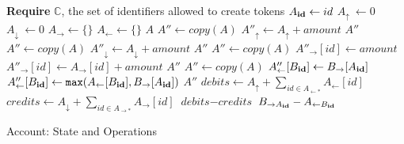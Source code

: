 \documentclass[9pt, oneside]{article}   	%
\begin{document}
\begin{algorithm}
\begin{algorithmic}[1]
   \State \textbf{Require} $\mathds{C}$, the set of identifiers allowed to create tokens
   \State
    	\State $A_{\scriptsize\textbf{id}} \leftarrow id$
	\State $A_\uparrow ~\leftarrow 0$       
	\State $A_\downarrow ~\leftarrow 0$   
	\State $A_\rightarrow \leftarrow \{ \}$ 
	\State $A_\leftarrow \leftarrow \{ \}$ 
    	\State \Return $A$
    \EndFunction
    \State
        \State $A'' \leftarrow \textit{copy}(A)$ 
		 \State $A''_\uparrow \leftarrow A_\uparrow + \textit{amount}$ 
	\EndIf
	\State \Return $A''$
    \EndFunction
    \State
        \State $A'' \leftarrow \textit{copy}(A)$
    	 \label{ln:burn-balance-check}
		 \State $A''_\downarrow \leftarrow A_\downarrow + \textit{amount}$ 
	\EndIf
	\State \Return $A''$
    \EndFunction
    \State
        \State $A'' \leftarrow \textit{copy}(A)$
    	  \label{ln:give-balance-check}
			\State $A''_{\rightarrow}[id] \leftarrow \textit{amount}$ 
		\Else
		         \State $A''_{\rightarrow}[id] \leftarrow A_{\rightarrow}[id] + \textit{amount}$ 
		\EndIf
	\EndIf
	\State \Return $A''$
    \EndFunction
    \State
        \State $A'' \leftarrow \textit{copy}(A)$
			 \State $A''_{\leftarrow}[B_{\scriptsize\textbf{id}}] \leftarrow B_{\rightarrow}[A_{\scriptsize\textbf{id}}]$
		\Else
			 \State $A''_{\leftarrow}[B_{\scriptsize\textbf{id}}] \leftarrow \texttt{max}(A_{\leftarrow}[B_{\scriptsize\textbf{id}}], B_{\rightarrow}[A_{\scriptsize\textbf{id}}])$ 
		\EndIf
        \EndIf
	\State \Return $A''$
    \EndFunction
    \State
        \State $\textit{debits} \leftarrow A_\uparrow + \sum\limits_{id \in A_{\leftarrow *}} A_{\leftarrow}[id]$ 
        \State $\textit{credits} \leftarrow A_\downarrow + \sum\limits_{id \in A_{\rightarrow *}} A_{\rightarrow}[id]$
        \State \Return $\textit{debits} - \textit{credits}$
    \EndFunction
    \State
        \State \Return $B_{\rightarrow A_{\tiny\textbf{id}}} - A_{\leftarrow B_{\tiny\textbf{id}}}$
    \EndFunction
    \end{algorithmic}
\caption{\label{alg:account} Account: State and Operations}
\end{algorithm}
\end{document}
